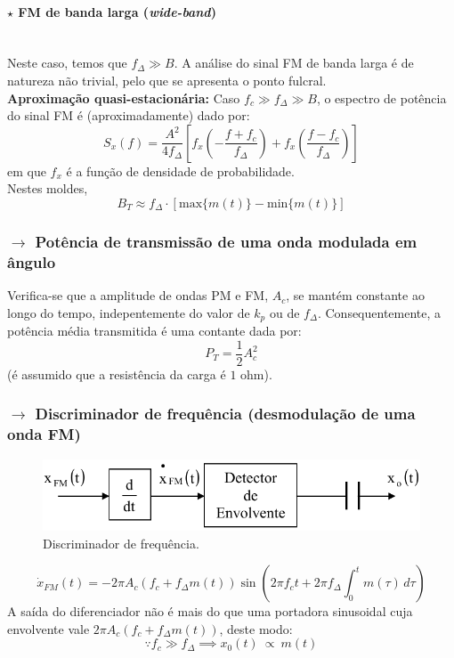 \paragraph[2.2.2.2 FM de banda larga]{$\pmb{\star}$ FM de banda larga (\textit{wide-band})}\mbox{}\\
Neste caso, temos que $f_\Delta \gg B$. A análise do sinal FM de banda larga é de natureza não trivial, pelo que se apresenta o ponto fulcral.
\\[6pt]
\noindent \textbf{Aproximação quasi-estacionária:} Caso $f_c \gg f_\Delta \gg B$, o espectro de potência do sinal FM é (aproximadamente) dado por:
$$
    S_x(f) = \frac{A^2}{4f_\Delta}\left[ f_x\left( -\frac{f+f_c}{f_\Delta} \right) + f_x\left( \frac{f-f_c}{f_\Delta} \right) \right]
$$
em que $f_x$ é a função de densidade de probabilidade.
\\[6pt]
\noindent Nestes moldes,
$$
     B_T \approx f_\Delta \cdot \left[ \text{max}\{m(t)\} - \text{min}\{m(t)\} \right]
$$
\subsubsection[2.2.3 Potência de transmissão de uma onda modulada em ângulo]{$\rightarrow$ Potência de transmissão de uma onda modulada em ângulo}
\label{subsubsec:FM-power}

Verifica-se que a amplitude de ondas PM e FM, $A_c$, se mantém constante ao longo do tempo, indepentemente do valor de $k_p$ ou de $f_\Delta$. Consequentemente, a potência média transmitida é uma contante dada por:
$$
    P_T = \frac{1}{2}A^2_c
$$
(é assumido que a resistência da carga é $1$ ohm).
\subsubsection[2.2.4 Discriminador de frequência (desmodulação de uma onda FM)]{$\rightarrow$ Discriminador de frequência (desmodulação de uma onda FM)}
\label{subsubsec:FM-discriminador}

\begin{figure}[H]
    \centering
    \includegraphics[width = 0.5\linewidth]{img/analog/FM/discriminadorFM.png}
    \caption{Discriminador de frequência\cite{Victor2010}.}
    \label{fig:FM-discriminador}
\end{figure}

$$
    \dot{x}_{FM}(t) = -2\pi A_c \left( f_c + f_\Delta m(t) \right) \sin(2\pi f_c t + 2\pi f_\Delta \int_{0}^{t} m(\tau)\, d\tau)
$$
 A saída do diferenciador não é mais do que uma portadora sinusoidal cuja envolvente vale $2\pi A_c (f_c + f_\Delta m(t))$, deste modo:
$$
    \because f_c \gg f_\Delta \implies x_0(t)\: \propto\: m(t)
$$

